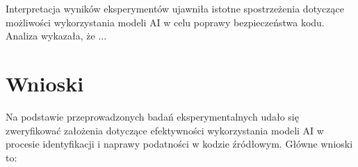 Interpretacja wyników eksperymentów ujawniła istotne spostrzeżenia dotyczące możliwości wykorzystania modeli AI w celu poprawy bezpieczeństwa kodu. Analiza wykazała, że ...


\section{Wnioski}
\label{sec:wnioski}

Na podstawie przeprowadzonych badań eksperymentalnych udało się zweryfikować założenia dotyczące efektywności wykorzystania modeli AI w procesie identyfikacji i naprawy podatności w kodzie źródłowym. Główne wnioski to:

